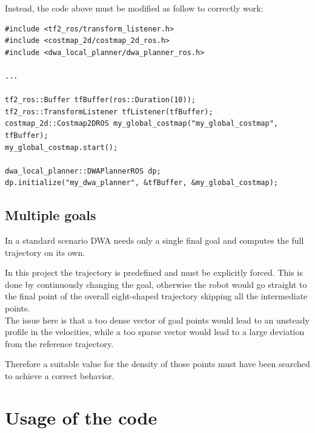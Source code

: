 \documentclass[11pt,a4paper]{article}
\begin{document}
Instead, the code above must be modified as follow to correctly work:

\begin{lstlisting}
#include <tf2_ros/transform_listener.h>
#include <costmap_2d/costmap_2d_ros.h>
#include <dwa_local_planner/dwa_planner_ros.h>

...

tf2_ros::Buffer tfBuffer(ros::Duration(10));
tf2_ros::TransformListener tfListener(tfBuffer);
costmap_2d::Costmap2DROS my_global_costmap("my_global_costmap", tfBuffer);
my_global_costmap.start();

dwa_local_planner::DWAPlannerROS dp;
dp.initialize("my_dwa_planner", &tfBuffer, &my_global_costmap);
\end{lstlisting}



\subsection{Multiple goals}

In a standard scenario DWA needs only a single final goal and computes the full trajectory on its own.

In this project the trajectory is predefined and must be explicitly forced.
This is done by continuously changing the goal, otherwise the robot would go straight to the final
point of the overall eight-shaped trajectory skipping all the intermediate points.\\

The issue here is that a too dense vector of goal points would lead to an unsteady profile in
the velocities, while a too sparse vector would lead to a large deviation from the reference trajectory.

Therefore a suitable value for the density of those points must have been searched to achieve a correct behavior.





\section{Usage of the code}
\end{document}
